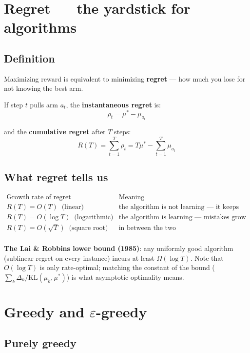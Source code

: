 \documentclass{article}
\begin{document}
\section*{Regret --- the yardstick for algorithms}

\subsection*{Definition}

Maximizing reward is equivalent to minimizing \textbf{regret} --- how much you lose for not knowing the best arm.

If step $t$ pulls arm $a_t$, the \textbf{instantaneous regret} is:
\[
\boxed{\rho_t = \mu^* - \mu_{a_t}}
\]

and the \textbf{cumulative regret} after $T$ steps:
\[
\boxed{R(T) = \sum_{t=1}^{T} \rho_t = T\mu^* - \sum_{t=1}^{T} \mu_{a_t}}
\]

\subsection*{What regret tells us}

\[
\begin{array}{c|c}
\text{Growth rate of regret} & \text{Meaning} \\
\hline
R(T) = O(T) \;\; \text{(linear)} & \text{the algorithm is not learning --- it keeps making mistakes} \\
R(T) = O(\log T) \;\; \text{(logarithmic)} & \text{the algorithm is learning --- mistakes grow ever rarer} \\
R(T) = O(\sqrt{T}) \;\; \text{(square root)} & \text{in between the two} \\
\end{array}
\]

\textbf{The Lai \& Robbins lower bound (1985)}: any uniformly good algorithm (sublinear regret on every instance) incurs at least $\Omega(\log T)$. Note that $O(\log T)$ is only rate-optimal; matching the constant of the bound ($\sum_k \Delta_k / \mathrm{KL}(\mu_k,\mu^*)$) is what asymptotic optimality means.

\section*{Greedy and $\varepsilon$-greedy}

\subsection*{Purely greedy}
\end{document}
